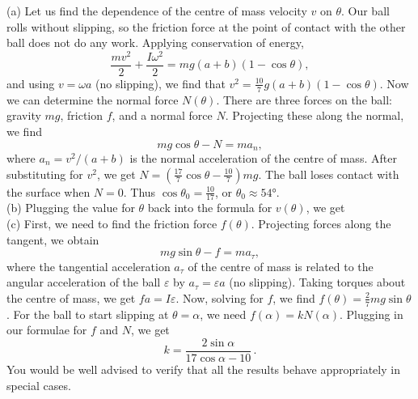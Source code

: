 \documentclass[../TST.tex]{subfiles}
\begin{document}
\ifprob \else
\begin{solution}
 (a) Let us find the dependence of the centre of mass velocity $v$ on $\theta$. Our ball rolls without slipping, so the friction force at the point of contact with the other ball does not do any work. Applying conservation of energy,
\begin{equation*}
	\frac{mv^2}{2} + \frac{I\omega^2}{2} = mg(a+b)(1-\cos{\theta}),
\end{equation*}
and using $v=\omega a$ (no slipping), we find that $v^2=\frac{10}{7}g(a+b)(1-\cos{\theta})$. Now we can determine the normal force $N(\theta)$. There are three forces on the ball: gravity $mg$, friction $f$, and a normal force $N$. Projecting these along the normal, we find 
\begin{equation*}
	mg\cos{\theta}-N=ma_n,
\end{equation*}
where $a_n=v^2/(a+b)$ is the normal acceleration of the centre of mass. After substituting for $v^2$, we get $N=\left(\frac{17}{7}\cos{\theta}- \frac{10}{7}\right)mg$. The ball loses contact with the surface when $N=0$. Thus $\cos{\theta_0}=\frac{10}{17}$, or $\boxed{\theta_0\approx \ang{54}.}$\\

(b) Plugging the value for $\theta$ back into the formula for $v(\theta)$, we get \\

(c) First, we need to find the friction force $f(\theta)$. Projecting forces along the tangent, we obtain
\begin{equation*}
	mg\sin{\theta}-f=ma_\tau
,
\end{equation*}
where the tangential acceleration $a_\tau$ of the centre of mass is related to the angular acceleration of the ball $\varepsilon$ by $a_\tau=\varepsilon a$ (no slipping). Taking torques about the centre of mass, we get $fa=I\varepsilon$. Now, solving for $f$, we find $f(\theta)=\frac{2}{7}mg\sin{\theta}$.  For the ball to start slipping at $\theta=\alpha$, we need $f(\alpha)=kN(\alpha)$. Plugging in our formulae for $f$ and $N$, we get 
\begin{equation*}
	\boxed{k=\frac{2\sin{\alpha}}{17\cos{\alpha}-10}}\,.
\end{equation*}
You would be well advised to verify that all the results behave appropriately in special cases.
\end{solution}
\fi
\ifprob
	\clearpage
\else
	\clearpage
\fi
\end{document}
